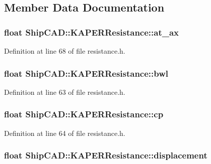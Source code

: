 \subsection{Member Data Documentation}
\hypertarget{structShipCAD_1_1KAPERResistance_a803e780e97a79538c29af4a28c0afd51}{
\subsubsection[{at\-\_\-ax}]{\setlength{\rightskip}{0pt plus 5cm}float Ship\-C\-A\-D\-::\-K\-A\-P\-E\-R\-Resistance\-::at\-\_\-ax}}\label{structShipCAD_1_1KAPERResistance_a803e780e97a79538c29af4a28c0afd51}


Definition at line 68 of file resistance.\-h.

\hypertarget{structShipCAD_1_1KAPERResistance_ab1cc995ebce998cfc19ef8b1501f328e}{
\subsubsection[{bwl}]{\setlength{\rightskip}{0pt plus 5cm}float Ship\-C\-A\-D\-::\-K\-A\-P\-E\-R\-Resistance\-::bwl}}\label{structShipCAD_1_1KAPERResistance_ab1cc995ebce998cfc19ef8b1501f328e}


Definition at line 63 of file resistance.\-h.

\hypertarget{structShipCAD_1_1KAPERResistance_a07797d6eb31e9a5506f7fca4b92d3f3a}{
\subsubsection[{cp}]{\setlength{\rightskip}{0pt plus 5cm}float Ship\-C\-A\-D\-::\-K\-A\-P\-E\-R\-Resistance\-::cp}}\label{structShipCAD_1_1KAPERResistance_a07797d6eb31e9a5506f7fca4b92d3f3a}


Definition at line 64 of file resistance.\-h.

\hypertarget{structShipCAD_1_1KAPERResistance_a5227818b90eab4991e339bbdf2e382ca}{
\subsubsection[{displacement}]{\setlength{\rightskip}{0pt plus 5cm}float Ship\-C\-A\-D\-::\-K\-A\-P\-E\-R\-Resistance\-::displacement}}\label{structShipCAD_1_1KAPERResistance_a5227818b90eab4991e339bbdf2e382ca}



